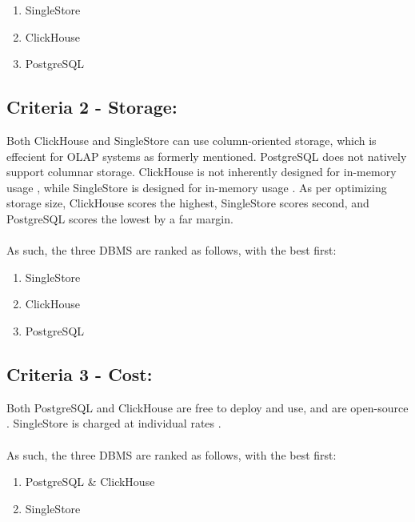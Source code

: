 \begin{enumerate}
    \item SingleStore
    \item ClickHouse
    \item PostgreSQL
\end{enumerate}
\subsection{Criteria 2 - Storage:}
Both ClickHouse and SingleStore can use column-oriented storage, which is effecient for OLAP systems as formerly mentioned. PostgreSQL does not natively support columnar storage.
ClickHouse is not inherently designed for in-memory usage \cite{clickhouseStorage}, while SingleStore is designed for in-memory usage \cite{singlestoreStorage}.
As per optimizing storage size, ClickHouse scores the highest, SingleStore scores second, and PostgreSQL scores the lowest by a  far margin.
\\\\
As such, the three DBMS are ranked as follows, with the best first:

\begin{enumerate}
    \item SingleStore
    \item ClickHouse
    \item PostgreSQL
\end{enumerate}
\subsection{Criteria 3 - Cost:}
Both PostgreSQL and ClickHouse are free to deploy and use, and are open-source \cite{clickhouseCost} \cite{postgresqlCost}. SingleStore is charged at individual rates \cite{singleStoreCost}.
\\\\
As such, the three DBMS are ranked as follows, with the best first:

\begin{enumerate}
    \item PostgreSQL \& ClickHouse
    \item SingleStore
\end{enumerate}
